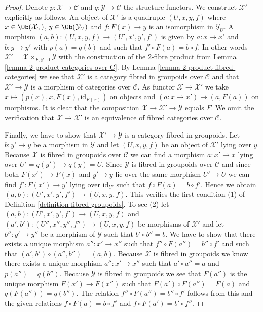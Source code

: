 \begin{proof}
Denote $p : \mathcal{X} \to \mathcal{C}$ and $q : \mathcal{Y} \to \mathcal{C}$
the structure functors. We construct $\mathcal{X}'$ explicitly as follows.
An object of $\mathcal{X}'$ is a quadruple $(U, x, y, f)$ where
$x \in \Ob(\mathcal{X}_U)$, $y \in \Ob(\mathcal{Y}_U)$
and $f : F(x) \to y$ is an isomorphism in $\mathcal{Y}_U$.
A morphism $(a, b) : (U, x, y, f) \to (U', x', y', f')$ is given
by $a : x \to x'$ and $b : y \to y'$ with $p(a) = q(b)$ and
such that $f' \circ F(a) = b \circ f$. In other words
$\mathcal{X}' = \mathcal{X} \times_{F, \mathcal{Y}, \text{id}} \mathcal{Y}$
with the construction of the $2$-fibre product from
Lemma \ref{lemma-2-product-categories-over-C}.
By
Lemma \ref{lemma-2-product-fibred-categories}
we see that $\mathcal{X}'$ is a category fibred in groupoids over
$\mathcal{C}$ and that $\mathcal{X}' \to \mathcal{Y}$ is a morphism of
categories over $\mathcal{C}$. As functor $\mathcal{X} \to \mathcal{X}'$ we take
$x \mapsto (p(x), x, F(x), \text{id}_{F(x)})$ on objects and
$(a : x \to x') \mapsto (a, F(a))$ on morphisms. It is clear that
the composition $\mathcal{X} \to \mathcal{X}' \to \mathcal{Y}$
equals $F$. We omit the verification that
$\mathcal{X} \to \mathcal{X}'$ is an equivalence of fibred categories over
$\mathcal{C}$.

\medskip\noindent
Finally, we have to show that $\mathcal{X}' \to \mathcal{Y}$ is a category
fibred in groupoids. Let $b : y' \to y$ be a morphism in $\mathcal{Y}$
and let $(U, x, y, f)$ be an object of $\mathcal{X}'$ lying over $y$.
Because $\mathcal{X}$ is fibred in groupoids over $\mathcal{C}$ we
can find a morphism $a : x' \to x$ lying over $U' = q(y') \to q(y) = U$.
Since $\mathcal{Y}$ is fibred in groupoids over $\mathcal{C}$ and since
both $F(x') \to F(x)$ and $y' \to y$ lie over the same morphism $U' \to U$
we can find $f' : F(x') \to y'$ lying over $\text{id}_{U'}$ such that
$f \circ F(a) = b \circ f'$. Hence we obtain
$(a, b) : (U', x', y', f') \to (U, x, y, f)$.
This verifies the first condition (1) of
Definition \ref{definition-fibred-groupoids}.
To see (2) let
$(a, b) : (U', x', y', f') \to (U, x, y, f)$ and
$(a', b') : (U'', x'', y'', f'') \to (U, x, y, f)$ be morphisms of
$\mathcal{X}'$ and let $b'' : y' \to y''$ be a morphism of $\mathcal{Y}$
such that $b' \circ b'' = b$. We have to show that there exists
a unique morphism $a'' : x' \to x''$ such that
$f'' \circ F(a'') = b'' \circ f'$ and such that
$(a', b') \circ (a'', b'') = (a, b)$. Because $\mathcal{X}$ is fibred
in groupoids we know there exists a unique morphism
$a'' : x' \to x''$ such that $a' \circ a'' = a$ and $p(a'') = q(b'')$.
Because $\mathcal{Y}$ is fibred in groupoids we see that
$F(a'')$ is the unique morphism $F(x') \to F(x'')$ such that
$F(a') \circ F(a'') = F(a)$ and $q(F(a'')) = q(b'')$. The relation
$f'' \circ F(a'') = b'' \circ f'$ follows from this and the given
relations $f \circ F(a) = b \circ f'$ and $f \circ F(a') = b' \circ f''$.
\end{proof}

